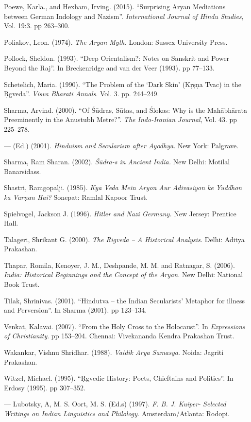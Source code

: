\begin{thebibliography}{99}
  Poewe, Karla., and Hexham, Irving. (2015). “Surprising Aryan Mediations between German Indology and Nazism”. \textit{International Journal of Hindu Studies}, Vol. 19:3. pp 263--300.

  Poliakov, Leon. (1974). \textit{The Aryan Myth.} London: Sussex University Press.

  Pollock, Sheldon. (1993). “Deep Orientalism?: Notes on Sanskrit and Power Beyond the Raj”. In Breckenridge and van der Veer (1993)\textit{. }pp 77--133.

  Schetelich, Maria. (1990). “The Problem of the ‘Dark Skin’ (Kṛṣṇa Tvac) in the Ṛgveda”. \textit{Visva Bharati Annals}. Vol. 3. pp. 244--249.

  Sharma, Arvind. (2000). “Of Śūdras, Sūtas, and Ślokas: Why is the Mahābhārata Preeminently in the Anustubh Metre?”. \textit{The Indo-Iranian Journal}, Vol. 43. pp 225--278.

  — (Ed.) (2001). \textit{Hinduism and Secularism after Ayodhya}. New York: Palgrave.

  Sharma, Ram Sharan. (2002). \textit{Śūdra-s in Ancient India.} New Delhi: Motilal Banarsidass.

  Shastri, Ramgopalji. (1985). \textit{Kyā Veda Mein Āryon Aur Ādivāsiyon ke Yuddhon ka Varṇan Hai?} Sonepat: Ramlal Kapoor Trust.

  Spielvogel, Jackson J. (1996). \textit{Hitler and Nazi Germany.} New Jersey: Prentice Hall.

  Talageri, Shrikant G. (2000). \textit{The Rigveda – A Historical Analysis.} Delhi: Aditya Prakashan.

  Thapar, Romila, Kenoyer, J. M., Deshpande, M. M. and Ratnagar, S. (2006). \textit{India: Historical Beginnings and the Concept of the Aryan. }New Delhi: National Book Trust.

  Tilak, Shrinivas. (2001). “Hindutva – the Indian Secularists’ Metaphor for illness and Perversion”. In Sharma (2001)\textit{.} pp 123--134.

  Venkat, Kalavai. (2007). “From the Holy Cross to the Holocaust”. In \textit{Expressions of Christianity}. pp 153--204. Chennai: Vivekananda Kendra Prakashan Trust.

  Wakankar, Vishnu Shridhar. (1988). \textit{Vaidik Arya Samasya}. Noida: Jagriti Prakashan.

  Witzel, Michael. (1995). “Ṛgvedic History: Poets, Chieftains and Politics”. In Erdosy (1995). pp 307--352.

  — Lubotsky, A, M. S. Oort, M. S. (Ed.s) (1997). \textit{F. B. J. Kuiper- Selected Writings on Indian Linguistics and Philology}. Amsterdam/Atlanta: Rodopi.

 \end{thebibliography}

\theendnotes

